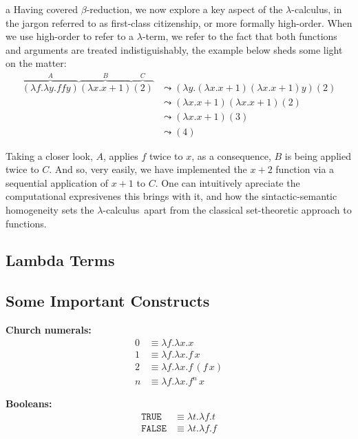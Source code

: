 \documentclass[12pt]{book}
\newcommand{\la}{\lambda}
\newcommand{\lcalc}{$\la$-calculus}
\newcommand{\bred}{$\beta$-reduction}
\newcommand{\curly}{\mathrel{\leadsto}}
\theoremstyle{plain}
\theoremstyle{definition}
\theoremstyle{definition}
\theoremstyle{definition}
\begin{document}
\newpage
a
\newpage
Having covered \bred, we now explore a key aspect of the \lcalc, in the jargon referred to as first-class citizenship, or more formally high-order. When we use high-order to refer to a $\la$-term, we refer to the fact that both functions and arguments are treated indistiguishably, the example below sheds some light on the matter:
\begin{align*}
  \overbrace { (\lambda f . \lambda y . f f y) }^{A} \overbrace{ (\lambda x . x + 1) }^{B} \overbrace{(2)}^{C}
  &\curly (\lambda y .(\lambda x . x + 1) (\lambda x . x + 1)y)(2) \\
  &\curly (\lambda x . x + 1)(\lambda x . x + 1)(2) \\
  &\curly (\lambda x . x + 1) (3) \\
  &\curly (4)
\end{align*}

Taking a closer look, $A$, applies $f$ twice to $x$, as a consequence, $B$ is being applied twice to $C$. And so, very easily, we have implemented the $ x + 2 $ function via a sequential application of $x + 1$ to $C$. One can intuitively apreciate the computational expresivenes this brings with it, and how the sintactic-semantic homogeneity sets the \lcalc \ apart from the classical set-theoretic approach to functions.

\subsection{\centering
  Lambda Terms}

\newpage
\subsection{\centering Some Important Constructs}

\textbf{Church numerals:}
\begin{align*}
0 &\equiv \lambda f.\lambda x. x \\
1 &\equiv \lambda f.\lambda x. f\,x \\
2 &\equiv \lambda f.\lambda x. f\,(f\,x) \\
n &\equiv \lambda f.\lambda x. f^n\,x
\end{align*}

\textbf{Booleans:}
\begin{align*}
\texttt{TRUE} &\equiv \lambda t.\lambda f. t \\
\texttt{FALSE} &\equiv \lambda t.\lambda f. f
\end{align*}
\end{document}
